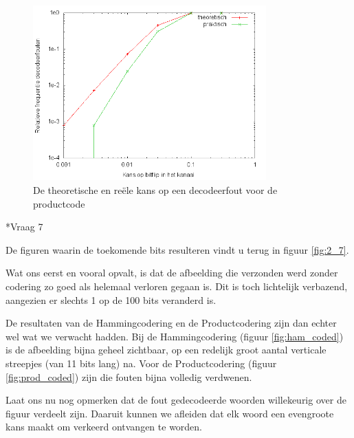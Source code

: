 \documentclass[]{article}
\begin{document}
\begin{section}
\begin{subsection}
    	\begin{figure}[h]
          	\centering
            	\includegraphics[width=0.8\textwidth]{vraag2_6.png}
            	\caption{De theoretische en re\"ele kans op een decodeerfout voor de productcode}
            	\label{fig:2_6}
        \end{figure}
    \end{subsection}

    \begin{subsection}*{Vraag 7} %

        De figuren waarin de toekomende bits resulteren vindt u terug in figuur
        \ref{fig:2_7}.
        
        Wat ons eerst en vooral opvalt, is dat de afbeelding die verzonden werd
        zonder codering zo goed als helemaal verloren gegaan is. Dit is toch
        lichtelijk verbazend, aangezien er slechts 1 op de 100 bits veranderd
        is.

        De resultaten van de Hammingcodering en de Productcodering zijn dan
        echter wel wat we verwacht hadden. Bij de Hammingcodering (figuur
        \ref{fig:ham_coded}) is de afbeelding bijna geheel zichtbaar, op een
        redelijk groot aantal verticale streepjes (van 11 bits lang) na. Voor
        de Productcodering (figuur \ref{fig:prod_coded}) zijn die fouten bijna
        volledig verdwenen.

        Laat ons nu nog opmerken dat de fout gedecodeerde woorden willekeurig
        over de figuur verdeelt zijn. Daaruit kunnen we afleiden dat elk
        woord een evengroote kans maakt om verkeerd ontvangen te worden.

        \begin{figure}
            \centering


\end{figure}
\end{subsection}
\end{section}
\end{document}
